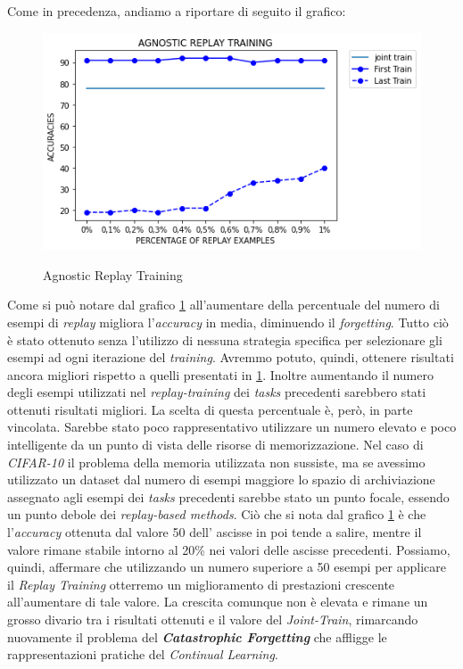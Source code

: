 Come in precedenza, andiamo a riportare di seguito il grafico:
\begin{figure}[ht]
\centering
\caption{Agnostic Replay Training}
\includegraphics[width=\linewidth]{img/Agnostic_Replay.png}
\label{figure : Angostic_replay}
\end{figure}
\newline
Come si può notare dal grafico \ref{figure : Angostic_replay} all'aumentare della percentuale del numero di esempi di \textit{replay} migliora l'\textit{accuracy} in media, diminuendo il \textit{forgetting}. Tutto ciò è stato ottenuto senza l'utilizzo di nessuna strategia specifica per selezionare gli esempi ad ogni iterazione del \textit{training}. Avremmo potuto, quindi, ottenere risultati ancora migliori rispetto a quelli presentati in \ref{figure : Angostic_replay}. \newline
Inoltre aumentando il numero degli esempi utilizzati nel \textit{replay-training} dei \textit{tasks} precedenti  sarebbero stati ottenuti risultati migliori.
\newline
La scelta di questa percentuale è, però, in parte vincolata. Sarebbe stato poco rappresentativo utilizzare un numero elevato e poco intelligente da un punto di vista delle risorse di memorizzazione. Nel caso di \textit{CIFAR-10} il problema della memoria utilizzata non sussiste, ma se avessimo utilizzato un dataset dal numero di esempi  maggiore lo spazio di archiviazione assegnato agli esempi dei \textit{tasks} precedenti sarebbe stato un punto focale, essendo un punto debole dei \textit{replay-based methods}.
Ciò che si nota dal grafico \ref{figure : Angostic_replay} è che l'\textit{accuracy} ottenuta dal valore 50 dell' ascisse in poi tende a salire, mentre il valore rimane stabile intorno al 20\% nei valori delle ascisse precedenti. Possiamo, quindi,
affermare che utilizzando un numero superiore a 50 esempi per applicare il \textit{Replay Training} otterremo un miglioramento di prestazioni crescente all'aumentare di tale valore.
\newline
 La crescita comunque non è elevata e rimane  un grosso divario tra i risultati ottenuti e il valore del \textit{Joint-Train}, rimarcando nuovamente il problema del \textbf{\textit{Catastrophic Forgetting}} che affligge le rappresentazioni pratiche del \textit{Continual Learning}.

